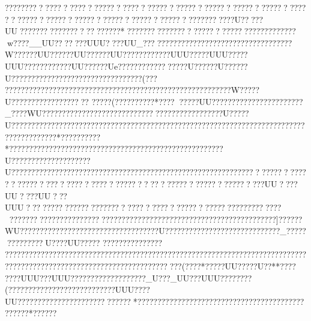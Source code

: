 {{{{{{{{{{{{{{{{{{{{{{{{{{{{{{{{{{{{{{{{{{{{{{{{{{{{{{{{{{{{{{{{{{{{{{{{{{{{{{{{{{{{{{{{{{{{{{{{{{{{{{{{{{{{{{{{{{{{{{{{{{{{{{{{{{{{{{{{{{{{{{{{{{{{{{{{{{{{{{{{{{{{{{{{{{{{{{{{{{{{{{{{{{{{{{{{{{{{{{{{{{{{{{{{{{{{{{{{{{{{{{{{{{{{{{{{{{{{{{{{{{{{{{{{{{{{{{{{{{{{{{{{{{{{{{{{{{{{{{{{{{{{{{{{{{{{{{{{{{{{{{{{{{{{{{{{{{{{{{{{{{{{{{{{{{{{{{{{{{{{{{{{{{{{{{{{{{{{{{{{{{{{{{{{{{{{{{{{{{{{{{{{{{{{{{{{{{{{{{{{{{{{{{{{{{{{{{{{{{{{{{{{{{{{{{{{{{{{{{{{{{{{{{{{{{{{{{{{{{{{{{{{{{{{{{{{{{{{{{{{{{{{{{{{{{{{{{{{{{{{{{{{{{{{{{{{{{{{{{{{{{{{{{{{{{{{{{{{{{{{{{{{{{{{{{{{{{{{{{{{{{{{{{{{{{{{{{{{{{{{{{{{{{{{{{{{{{{{{{{{{{{{{{{{{{{{{{{{{{{{{{{{{{{{{{{{{{{{{{{{{{{{{{{{{{{{{{{{{{{{{{{{{{{{{{{{{{{{{{{{{{{{{{{{{{{{{{{{{{{{{{{{{{{{{{{{{{{{{{{{{{{{{{{{{{{{{{{{{{{{{{{{{{{{{{{{{{{{{{{{{{{{{{{{{{{{{{{{{{{{{{{{{{{{{{{{{????? ????? ????? ??????????? ???????????????????????????????????????????????????????????????????????????????????????U?????UU????????????????   ???????*???????????????????????????????????????w????__UU???   ????UUU????UU_????  ?????????????????????????????????W??????UU??????UU??????UU????????????UUU?????UUU?????UUU????????????UU??  ????Ue???? ?????????????U??????U??????U?????????????????????????????????( ??? ?????????????????????????????????????????????????????????W?????U???????????????????
?????(????? ????? *???? ?????UU???????????????????????_????WU???????? ?????????????????????????????????????U?????U???????????????????????????????????????????????????????????????????????????????????????*??????????*??????????????????????????????????????????????????????U????????????????????U?????????????????????????????????????????????????????????????????????????????????  ???? ????? ??????????? ????????????????????????UU????UU????UU???UUU??   ????  ????? ???????????? ????? ???????????????????????????????????????????????????????????? ??????????????????????????????????]??????WU???   ????   ???? ?????????????? ??????????U?????????????????????????????_??????????}????U????UU??   ???  
???  ????????????  ???????????????????????????????????????????????????????????????????????????????   ????   ????  ?????  ?????  ?????  ?????  ?????  ?????  ???  (????  *?????UU?????U??**????  
????UUU???UUU??  ???? ?????????????_U???_UU???UUU???  ?????  (???  ?????  ?????  ?????  ?????   ????UUU????UU???????????????????????????? *????????????????????????????????????????????????*??????
}}}}}}}}}}}}}}}}}}}}}}}}}}}}}}}}}}}}}}}}}}}}}}}}}}}}}}}}}}}}}}}}}}}}}}}}}}}}}}}}}}}}}}}}}}}}}}}}}}}}}}}}}}}}}}}}}}}}}}}}}}}}}}}}}}}}}}}}}}}}}}}}}}}}}}}}}}}}}}}}}}}}}}}}}}}}}}}}}}}}}}}}}}}}}}}}}}}}}}}}}}}}}}}}}}}}}}}}}}}}}}}}}}}}}}}}}}}}}}}}}}}}}}}}}}}}}}}}}}}}}}}}}}}}}}}}}}}}}}}}}}}}}}}}}}}}}}}}}}}}}}}}}}}}}}}}}}}}}}}}}}}}}}}}}}}}}}}}}}}}}}}}}}}}}}}}}}}}}}}}}}}}}}}}}}}}}}}}}}}}}}}}}}}}}}}}}}}}}}}}}}}}}}}}}}}}}}}}}}}}}}}}}}}}}}}}}}}}}}}}}}}}}}}}}}}}}}}}}}}}}}}}}}}}}}}}}}}}}}}}}}}}}}}}}}}}}}}}}}}}}}}}}}}}}}}}}}}}}}}}}}}}}}}}}}}}}}}}}}}}}}}}}}}}}}}}}}}}}}}}}}}}}}}}}}}}}}}}}}}}}}}}}}}}}}}}}}}}}}}}}}}}}}}}}}}}}}}}}}}}}}}}}}}}}}}}}}}}}}}}}}}}}}}}}}}}}}}}}}}}}}}}}}}}}}}}}}}}}}}}}}}}}}}}}}}}}}}}}}}}}}}}}}}}}}}}}}}}}}}}}}}}}}}}}}}}}}}}}}}}}}}}}}}}}}}}}}}}}}}}}}}}}}}}}}}}}}}}}}}}}}}}}}}}}}}}
